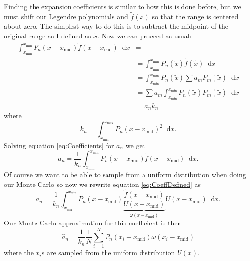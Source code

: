 \documentclass[12pt]{article}
\newcommand{\xmax}{x_{\max}}
\newcommand{\xmin}{x_{\min}}
\newcommand{\xmid}{x_{\mathrm{mid}}}
\newcommand{\xt}{x-\xmid}
\newcommand{\dd}{\mathop{}\!\mathrm{d}}
\begin{document}
Finding the expansion coefficients is similar to how this is done before, but we must shift our Legendre polynomials and $\tilde{f}(x)$ so that the range is centered about zero.  The simplest way to do this is to subtract the midpoint of the original range as I defined as $\tilde{x}$.  Now we can proceed as usual:
\begin{equation}
    \begin{split}
        \int_{\xmin}^{\xmin} P_n(\xt)\tilde{f}(\xt) \dd x &= \\
        &= \int_{\xmin}^{\xmin} P_n(\tilde{x})\tilde{f}(\tilde{x}) \dd x \\
        &= \int_{\xmin}^{\xmin} P_n(\tilde{x})\sum a_m P_m(\tilde{x}) \dd x \\
        &= \sum a_m \int_{\xmin}^{\xmin} P_n(\tilde{x})P_m(\tilde{x}) \dd x \\
        &= a_n k_n
    \end{split}
    \label{eq:Coefficients}
\end{equation}
where
\begin{equation}
    k_n = \int_{\xmin}^{\xmax} P_n(\xt)^2 \dd x.
    \label{eq:knDefined}
\end{equation}
Solving equation \eqref{eq:Coefficients} for $a_n$ we get
\begin{equation}
    a_n = \frac{1}{k_n}\int_{\xmin}^{\xmin} P_n(\xt)\tilde{f}(\xt) \dd x.
    \label{eq:CoeffDefined}
\end{equation}
Of course we want to be able to sample from a uniform distribution when doing our Monte Carlo so now we rewrite equation \eqref{eq:CoeffDefined} as
\begin{equation}
    a_n = \frac{1}{k_n}\int_{\xmin}^{\xmin} P_n(\xt)\underbrace{\frac{\tilde{f}(\xt)}{U(\xt)}}_{\omega(\xt)}U(\xt) \dd x.
    \label{eq:CoeffDefined}
\end{equation}
Our Monte Carlo approximation for this coefficient is then
\begin{equation}
    \hat{a}_n = \frac{1}{k_n}\frac{1}{N} \sum_{i=1}^N P_n(x_i - \xmid) \omega(x_i - \xmid)
    \label{eq:MCCoefficients}
\end{equation}
where the $x_i$s are sampled from the uniform distribution $U(x)$.
\end{document}
